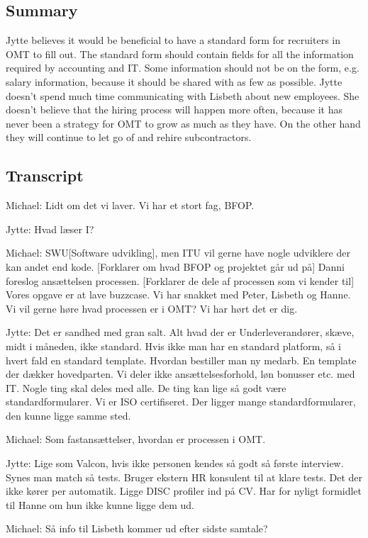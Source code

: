 \begin{linenumbers*}
\subsection{Summary}
Jytte believes it would be beneficial to have a standard form for recruiters in OMT to fill out.
The standard form should contain fields for all the information required by accounting and IT.
Some information should not be on the form, e.g. salary information, because it should be shared with as few as possible.
Jytte doesn't spend much time communicating with Lisbeth about new employees.
She doesn't believe that the hiring process will happen more often, because it has never been a strategy for OMT to grow as much as they have.
On the other hand they will continue to let go of and rehire subcontractors.
\subsection{Transcript}
Michael:
Lidt om det vi laver. Vi har et stort fag, BFOP.

Jytte:
Hvad læser I?

Michael:
SWU[Software udvikling], men ITU vil gerne have nogle udviklere
der kan andet end kode.
[Forklarer om hvad BFOP og projektet går ud på]
Danni foreslog ansættelsen processen. 
[Forklarer de dele af processen som vi kender til]
Vores opgave er at lave buzzcase. Vi har snakket med Peter,
Lisbeth og Hanne. Vi vil gerne høre hvad processen er i OMT?
Vi har hørt det er dig.

Jytte:
Det er sandhed med gran salt. Alt hvad der er
Underleverandører, skæve, midt i måneden, ikke standard.
Hvis ikke man har en standard platform, så i hvert fald
en standard template. 
Hvordan bestiller man ny medarb. En template der dækker hovedparten.
Vi deler ikke ansættelsesforhold, løn bonusser etc. med IT.
Nogle ting skal deles med alle. De ting kan lige så godt være
standardformularer.
Vi er ISO certifiseret. Der ligger mange standardformularer,
den kunne ligge samme sted.

Michael:
Som fastansættelser, hvordan er processen i OMT.

Jytte:
Lige som Valcon, hvis ikke personen kendes så godt så første interview. 
Synes man match så tests. Bruger ekstern HR konsulent til at klare tests.
Det der ikke kører per automatik. Ligge DISC profiler ind på CV. 
Har for nyligt formidlet til Hanne om hun ikke kunne ligge dem ud.

Michael:
Så info til Lisbeth kommer ud efter sidste samtale?


\end{linenumbers*}
